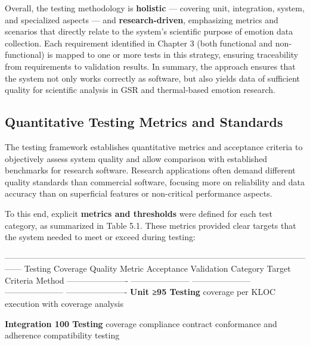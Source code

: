 Overall, the testing methodology is \textbf{holistic} --- covering unit,
integration, system, and specialized aspects --- and \textbf{research-driven},
emphasizing metrics and scenarios that directly relate to the system's
scientific purpose of emotion data collection. Each requirement
identified in Chapter 3 (both functional and non-functional) is mapped
to one or more tests in this strategy, ensuring traceability from
requirements to validation results. In summary, the approach ensures
that the system not only works correctly as software, but also yields
data of sufficient quality for scientific analysis in GSR and
thermal-based emotion research.

\subsection{Quantitative Testing Metrics and Standards}

The testing framework establishes quantitative metrics and acceptance
criteria to objectively assess system quality and allow comparison with
established benchmarks for research software. Research applications
often demand different quality standards than commercial software,
focusing more on reliability and data accuracy than on superficial
features or non-critical performance aspects.

To this end, explicit \textbf{metrics and thresholds} were defined for each
test category, as summarized in Table 5.1. These metrics provided clear
targets that the system needed to meet or exceed during testing:

  ------------------------------------------------------------------------------------------------------------------
  Testing         Coverage       Quality Metric Acceptance     Validation
  Category        Target                        Criteria       Method
  ---------------------- --------------------- --------------------- --------------------- ----------------------
  \textbf{Unit          ≥95%
  Testing}       coverage                      per KLOC       execution with
                                                               coverage
                                                               analysis

  \textbf{Integration   100%
  Testing}       coverage       compliance     contract       conformance and
                                                adherence      compatibility
                                                               testing

